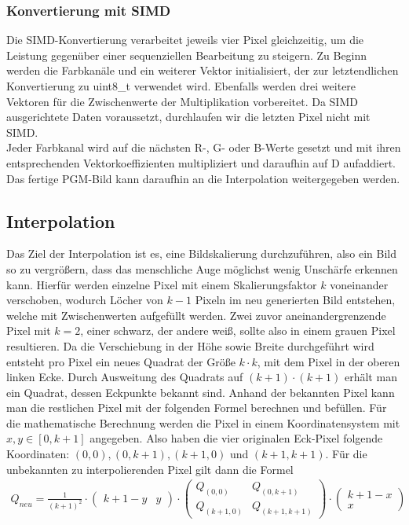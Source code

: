 \documentclass[course=erap]{aspdoc}
\begin{document}
\subsubsection{Konvertierung mit SIMD}
Die SIMD-Konvertierung verarbeitet jeweils vier Pixel gleichzeitig, um die Leistung gegenüber einer sequenziellen Bearbeitung zu steigern. Zu Beginn werden die Farbkanäle und ein weiterer Vektor initialisiert, der zur letztendlichen Konvertierung zu uint8\_t verwendet wird. Ebenfalls werden drei weitere Vektoren für die Zwischenwerte der Multiplikation vorbereitet. Da SIMD ausgerichtete Daten voraussetzt, durchlaufen wir die letzten Pixel nicht mit SIMD.\\
Jeder Farbkanal wird auf die nächsten R-, G- oder B-Werte gesetzt und mit ihren entsprechenden Vektorkoeffizienten multipliziert und daraufhin auf D aufaddiert. Das fertige PGM-Bild kann daraufhin an die Interpolation weitergegeben werden.

\subsection{Interpolation}
Das Ziel der Interpolation ist es, eine Bildskalierung durchzuführen, also ein Bild so zu vergrößern, dass das menschliche Auge möglichst wenig Unschärfe erkennen kann. Hierfür werden einzelne Pixel mit einem Skalierungsfaktor $k$ voneinander verschoben, wodurch Löcher von $k-1$ Pixeln im neu generierten Bild entstehen, welche mit Zwischenwerten aufgefüllt werden. Zwei zuvor aneinandergrenzende Pixel mit $k = 2$, einer schwarz, der andere weiß, sollte also in einem grauen Pixel resultieren. Da die Verschiebung in der Höhe sowie Breite durchgeführt wird entsteht pro Pixel ein neues Quadrat der Größe $k \cdot k$, mit dem Pixel in der oberen linken Ecke. Durch Ausweitung des Quadrats auf $(k+1) \cdot (k+1)$ erhält man
ein Quadrat, dessen Eckpunkte bekannt sind. Anhand der bekannten Pixel kann man die restlichen Pixel mit der folgenden Formel berechnen und befüllen. Für die mathematische Berechnung werden die Pixel in einem Koordinatensystem mit $x, y \in [0, k+1]$ angegeben. Also haben die vier originalen Eck-Pixel folgende Koordinaten: $(0, 0), (0, k+1), (k+1, 0)$ und $(k+1, k+1)$. Für die unbekannten zu interpolierenden Pixel gilt dann die Formel
 \begin{align}
    Q_{neu} {=}  \frac{1}{(k+1)^2} \cdot
    \begin{pmatrix} k+1-y & y \end{pmatrix} \cdot
    \begin{pmatrix} Q_{(0,0)} & Q_{(0,k+1)} \\ Q_{(k+1,0)} & Q_{(k+1,k+1)} \end{pmatrix}
    \cdot
     \begin{pmatrix} k+1-x \\ x \end{pmatrix} 
\end{align}
\end{document}
